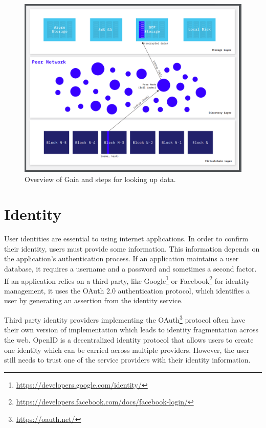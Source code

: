 		\begin{figure}[h]
			\includegraphics[width=\linewidth]{figures/gaia-overview}
			\caption{\label{fig:gaia-overview} Overview of Gaia and steps for looking up data.\protect\footnotemark}
		\end{figure}
		
	
\section{Identity}
	User identities are essential to using internet applications. In order to confirm their identity, users must provide some information. This information depends on the application's authentication process. If an application maintains a user database, it requires a username and a password and sometimes a second factor. If an application relies on a third-party, like Google\footnote{\url{https://developers.google.com/identity/}} or Facebook\footnote{\url{https://developers.facebook.com/docs/facebook-login/}} for identity management, it uses the OAuth 2.0 authentication\cite{hardt2012oauth} protocol, which identifies a user by generating an assertion from the identity service.
	
	Third party identity providers implementing the OAuth\footnote{\url{https://oauth.net/}} protocol often have their own version of implementation which leads to identity fragmentation across the web. OpenID\cite{recordon2006openid} is a decentralized identity protocol that allows users to create one identity which can be carried across multiple providers. However, the user still needs to trust one of the service providers with their identity information\cite{raval2016decentralized}.
	
